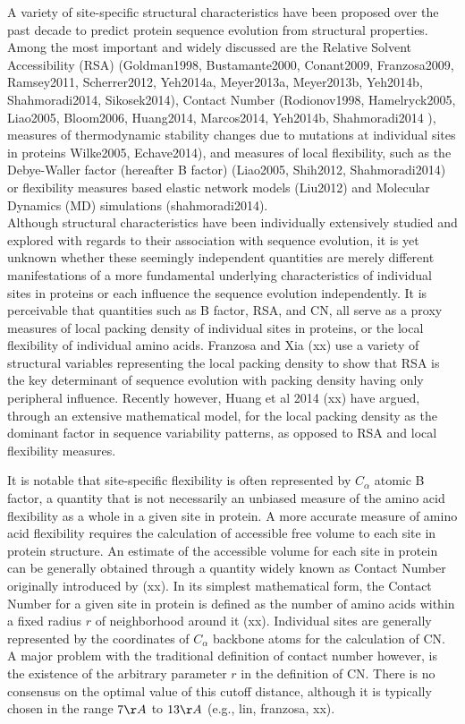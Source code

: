 \documentclass[11pt]{article}
\begin{document}
    A variety of site-specific structural characteristics have been proposed over the past decade to predict protein sequence evolution from structural properties. Among the most important and widely discussed are the Relative Solvent Accessibility (RSA) (Goldman1998, Bustamante2000, Conant2009, Franzosa2009, Ramsey2011, Scherrer2012, Yeh2014a, Meyer2013a, Meyer2013b, Yeh2014b, Shahmoradi2014, Sikosek2014), Contact Number (Rodionov1998, Hamelryck2005, Liao2005, Bloom2006, Huang2014, Marcos2014, Yeh2014b, Shahmoradi2014 ), measures of thermodynamic stability changes due to mutations at individual sites in proteins \citep[e.g.,][]{} Wilke2005, Echave2014), and measures of local flexibility, such as the Debye-Waller factor (hereafter B factor) (Liao2005, Shih2012, Shahmoradi2014) or flexibility measures based elastic network models (Liu2012) and Molecular Dynamics (MD) simulations (shahmoradi2014). \\

    Although structural characteristics have been individually extensively studied and explored with regards to their association with sequence evolution, it is yet unknown whether these seemingly independent quantities are merely different manifestations of a more fundamental underlying characteristics of individual sites in proteins or each influence the sequence evolution independently. It is perceivable that quantities such as B factor, RSA, and CN, all serve as a proxy measures of local packing density of individual sites in proteins, or the local flexibility of individual amino acids. \citep[][]{}Franzosa and Xia (xx) use a variety of structural variables representing the local packing density to show that RSA is the key determinant of sequence evolution with packing density having only peripheral influence. Recently however, Huang et al 2014 (xx) have argued, through an extensive mathematical model, for the local packing density as the dominant factor in sequence variability patterns, as opposed to RSA and local flexibility measures.
    
    It is notable that site-specific flexibility is often represented by $C_\alpha$ atomic B factor, a quantity that is not necessarily an unbiased measure of the amino acid flexibility as a whole in a given site in protein. A more accurate measure of amino acid flexibility requires the calculation of accessible free volume to each site in protein structure. An estimate of the accessible volume for each site in protein can be generally obtained through a quantity widely known as Contact Number originally introduced by (xx). In its simplest mathematical form, the Contact Number for a given site in protein is defined as the number of amino acids within a fixed radius $r$ of neighborhood around it (xx). Individual sites are generally represented by the coordinates of $C_\alpha$ backbone atoms for the calculation of CN. A major problem with the traditional definition of contact number however, is the existence of the arbitrary parameter $r$ in the definition of CN. There is no consensus on the optimal value of this cutoff distance, although it is typically chosen in the range $7\AA$ to $13\AA$ (e.g., lin, franzosa, xx). \\
\end{document}
